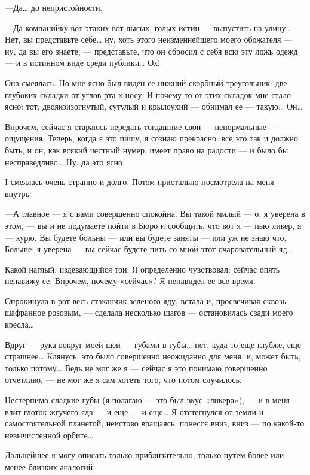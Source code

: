 \documentclass[11pt,openany]{book}
\begin{document}
---Да\ldots{} до непристойности.

---Да компанийку вот этаких вот лысых, голых истин --- выпустить на улицу\ldots{} Нет, вы представьте себе\ldots{} ну, хоть этого неизменнейшего моего обожателя --- ну, да вы его знаете, --- представьте, что он сбросил с себя всю эту ложь одежд --- и в истинном виде среди публики\ldots{} Ох!

Она смеялась. Но мне ясно был виден ее нижний скорбный треугольник: две глубоких складки от углов рта к носу. И почему-то от этих складок мне стало ясно: тот, двоякоизогнутый, сутулый и крылоухий --- обнимал ее --- такую\ldots{} Он\ldots{}

Впрочем, сейчас я стараюсь передать тогдашние свои --- ненормальные --- ощущения. Теперь, когда я это пишу, я сознаю прекрасно: все это так и должно быть, и он, как всякий честный нумер, имеет право на радости --- и было бы несправедливо\ldots{} Ну, да это ясно.

I смеялась очень странно и долго. Потом пристально посмотрела на меня --- внутрь:

---А главное --- я с вами совершенно спокойна. Вы такой милый --- о, я уверена в этом, --- вы и не подумаете пойти в Бюро и сообщить, что вот я --- пью ликер, я --- курю. Вы будете больны --- или вы будете заняты --- или уж не знаю что. Больше: я уверена --- вы сейчас будете пить со мной этот очаровательный яд\ldots{}

Какой наглый, издевающийся тон. Я определенно чувствовал: сейчас опять ненавижу ее. Впрочем, почему «сейчас»? Я ненавидел ее все время.

Опрокинула в рот весь стаканчик зеленого яду, встала и, просвечивая сквозь шафранное розовым, --- сделала несколько шагов --- остановилась сзади моего кресла\ldots{}

Вдруг --- рука вокруг моей шеи --- губами в губы\ldots{} нет, куда-то еще глубже, еще страшнее\ldots{} Клянусь, это было совершенно неожиданно для меня, и, может быть, только потому\ldots{} Ведь не мог же я --- сейчас я это понимаю совершенно отчетливо, --- не мог же я сам хотеть того, что потом случилось.

Нестерпимо-сладкие губы (я полагаю --- это был вкус «ликера»), --- и в меня влит глоток жгучего яда --- и еще --- и еще\ldots{} Я отстегнулся от земли и самостоятельной планетой, неистово вращаясь, понесся вниз, вниз --- по какой-то невычисленной орбите\ldots{}

Дальнейшее я могу описать только приблизительно, только путем более или менее близких аналогий.
\end{document}
